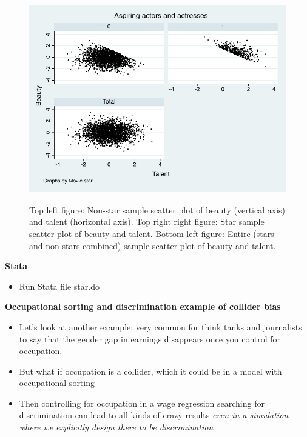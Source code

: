 \documentclass[notes=show]{beamer}
\begin{document}
\begin{frame}[shrink=20,plain]

	\begin{figure}
	\includegraphics[height=9cm]{./lecture_includes/beauty_collider.pdf}     
	\caption{Top left figure: Non-star sample scatter plot of beauty (vertical axis) and talent (horizontal axis). Top right right figure: Star sample scatter plot of beauty and talent.  Bottom left figure: Entire (stars and non-stars combined) sample scatter plot of beauty and talent.}
	\end{figure}
\end{frame}


\begin{frame}[plain]
\begin{center}
\textbf{Stata}
\end{center}

\begin{itemize}
\item Run Stata file star.do
\end{itemize}

\end{frame}


\begin{frame}[plain]
\begin{center}
\textbf{Occupational sorting and discrimination example of collider bias}
\end{center}

\begin{itemize}
\item Let's look at another example: very common for think tanks and journalists to say that the gender gap in earnings disappears once you control for occupation.
\item But what if occupation is a collider, which it could be in a model with occupational sorting
\item Then controlling for occupation in a wage regression searching for discrimination can lead to all kinds of crazy results \emph{even in a simulation where we explicitly design there to be discrimination}
\end{itemize}

\end{frame}
\end{document}
